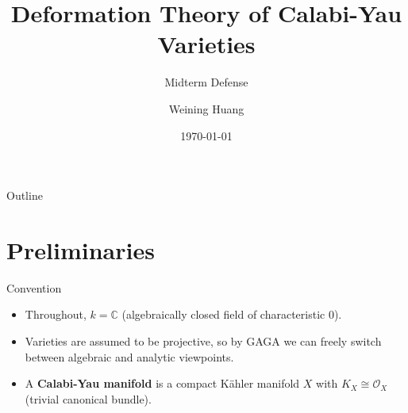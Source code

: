 \documentclass{beamer}
\title{Deformation Theory of Calabi-Yau Varieties}
\subtitle{Midterm Defense}
\author{Weining Huang}
\institute{Beihang University \\ School of Mathematical Sciences}
\date{\today}
\theoremstyle{definition}
\theoremstyle{plain}
\begin{document}
\begin{frame}
    \thispagestyle{empty}
    \maketitle
\end{frame}

\begin{frame}{Outline}
    \tableofcontents
\end{frame}

\section{Preliminaries}

\begin{frame}{Convention}
    \begin{itemize}
        \item Throughout, $k = \mathbb{C}$ (algebraically closed field of characteristic $0$).
        \item Varieties are assumed to be projective, so by GAGA we can freely switch between algebraic and analytic viewpoints.
        \item A \textbf{Calabi-Yau manifold} is a compact Kähler manifold $X$ with $K_X \cong \mathcal{O}_X$ (trivial canonical bundle).
    \end{itemize}
\end{frame}
\end{document}
